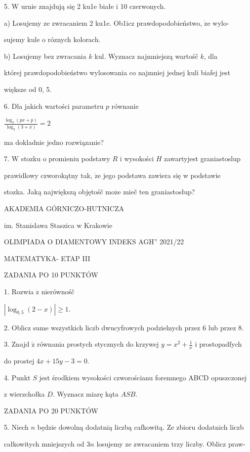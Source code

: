 \documentclass[a4paper,12pt]{article}
\begin{document}
5. $\mathrm{W}$ urnie znajdują się 2 ku1e białe i 10 czerwonych.

a) Losujemy ze zwracaniem 2 ku1e. Ob1icz prawdopodobieństwo, $\dot{\mathrm{z}}\mathrm{e}$ wylo-

sujemy kule o róznych kolorach.

b) Losujemy bez zwracania $k$ kul. Wyznacz najmniejszą wartośč $k$, dla

której prawdopodobieństwo wylosowania co najmniej jednej kuli biafej jest

większe od 0, 5.

6. Dla jakich wartości parametru $p$ równanie

$\displaystyle \frac{\log_{3}(px+p)}{\log_{3}(3+x)}=2$

ma dokladnie jedno rozwiązanie?

7. $\mathrm{W}$ stozku o promieniu podstawy $R$ i wysokości $H$ zawartyjest graniastoslup

prawidlowy czworokątny tak, $\dot{\mathrm{z}}\mathrm{e}$ jego podstawa zawiera się w podstawie

stozka. Jaką największą objętośč $\mathrm{m}\mathrm{o}\dot{\mathrm{z}}\mathrm{e}$ mieč ten graniastosłup?






AKADEMIA GÓRNICZO-HUTNICZA

im. Stanislawa Staszica w Krakowie

OLIMPIADA O DIAMENTOWY INDEKS AGH'' 2021/22

MATEMATYKA- ETAP III

ZADANIA PO 10 PUNKTÓW

1. Rozwia $\dot{\mathrm{z}}$ nierównośč

$|\log_{0,5}(2-x)|\geq 1.$

2. Oblicz sume wszystkich liczb dwucyfrowych podzielnych przez 6 lub przez 8.

3. Znajd $\acute{\mathrm{z}}$ równania prostych stycznych do krzywej $y=x^{2}+\displaystyle \frac{1}{x}$ i prostopadfych

do prostej $4x+15y-3=0.$

4. Punkt $S$ jest środkiem wysokości czworościanu foremnego ABCD opuszczonej

z wierzchołka $D$. Wyznacz miarę kąta $ASB.$

ZADANIA PO 20 PUNKTÓW

5. Niech $n$ będzie dowolną dodatnią liczbą cafkowitą. Ze zbioru dodatnich liczb

całkowitych mniejszych od $3n$ losujemy ze zwracaniem trzy liczby. Oblicz praw-
\end{document}
